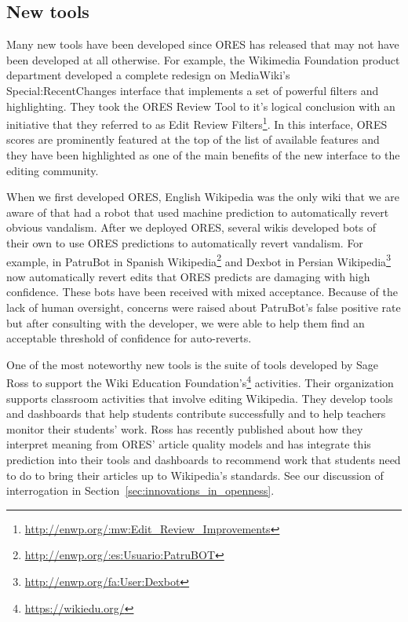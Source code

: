 \subsection{New tools}

Many new tools have been developed since ORES has released that may not have been developed at all otherwise.  For example, the Wikimedia Foundation product department developed a complete redesign on MediaWiki's Special:RecentChanges interface that implements a set of powerful filters and highlighting.  They took the ORES Review Tool to it's logical conclusion with an initiative that they referred to as Edit Review Filters\footnote{\url{http://enwp.org/:mw:Edit_Review_Improvements}}.  In this interface, ORES scores are prominently featured at the top of the list of available features and they have been highlighted as one of the main benefits of the new interface to the editing community.

When we first developed ORES, English Wikipedia was the only wiki that we are aware of that had a robot that used machine prediction to automatically revert obvious vandalism\cite{carter2008cluebot}.  After we deployed ORES, several wikis developed bots of their own to use ORES predictions to automatically revert vandalism.  For example, in PatruBot in Spanish Wikipedia\footnote{\url{http://enwp.org/:es:Usuario:PatruBOT}} and Dexbot in Persian Wikipedia\footnote{\url{http://enwp.org/fa:User:Dexbot}} now automatically revert edits that ORES predicts are damaging with high confidence.  These bots have been received with mixed acceptance.  Because of the lack of human oversight, concerns were raised about PatruBot's false positive rate but after consulting with the developer, we were able to help them find an acceptable threshold of confidence for auto-reverts.

One of the most noteworthy new tools is the suite of tools developed by Sage Ross to support the Wiki Education Foundation's\footnote{\url{https://wikiedu.org/}} activities.  Their organization supports classroom activities that involve editing Wikipedia.  They develop tools and dashboards that help students contribute successfully and to help teachers monitor their students' work.  Ross has recently published about how they interpret meaning from ORES' article quality models\cite{ross2016visualizing} and has integrate this prediction into their tools and dashboards to recommend work that students need to do to bring their articles up to Wikipedia's standards.  See our discussion of interrogation in Section~\ref{sec:innovations_in_openness}.
